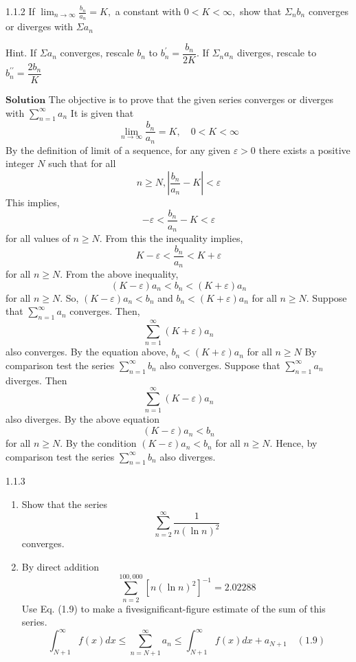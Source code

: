 \newpage






\begin{mybox}{1.1.2}
If $\displaystyle \lim _{n \rightarrow \infty} \frac{b_{n}}{a_{n}}=K,$ a constant with $0<K<\infty,$ show that $\Sigma_{n} b_{n}$ converges or diverges with $\Sigma a_{n}$

Hint. If $\Sigma a_{n}$ converges, rescale $b_{n}$ to $b_{n}^{\prime}=\dfrac{b_{n}}{2 K} .$ If $\Sigma_{n} a_{n}$ diverges, rescale to $b_{n}^{\prime \prime}=\dfrac{2 b_{n}}{K}$
\end{mybox}


$\boxed{\textbf{Solution}}$ The objective is to prove that the given series converges or diverges with $\sum_{n=1}^{\infty} a_{n}$
It is given that 
$$\lim_{n\rightarrow \infty} \frac{b_{n}}{a_{n}}=K, \quad 0<K<\infty$$
By the definition of limit of a sequence, for any given $\varepsilon>0$ there exists a positive integer $N$ such that for all 
$$n \geq N,\left|\frac{b_{n}}{a_{n}}-K\right|<\varepsilon$$
This implies, 
$$-\varepsilon<\frac{b_{n}}{a_{n}}-K<\varepsilon$$ for all values of $n \geq N$.
From this the inequality implies, 
$$K-\varepsilon<\frac{b_{n}}{a_{n}}<K+\varepsilon$$
for all $n \geq N$. From the above inequality, 
$$(K-\varepsilon) a_{n}<b_{n}<(K+\varepsilon) a_{n}$$ 
for all $n \geq N$. So, $(K-\varepsilon) a_{n}<b_{n}$ and $b_{n}<(K+\varepsilon) a_{n}$ for all $n \geq N$. Suppose that $\sum_{n=1}^{\infty} a_{n}$ converges. Then, 
$$\sum_{n=1}^{\infty}(K+\varepsilon) a_{n}$$ 
also converges. By the equation above, $b_{n}<(K+\varepsilon) a_{n}$ for all $n \geq N$
By comparison test the series $\sum_{n=1}^{\infty} b_{n}$ also converges. Suppose that $\sum_{n=1}^{\infty} a_{n}$ diverges. Then 
$$\sum_{n=1}^{\infty}(K-\varepsilon) a_{n}$$ 
also diverges. By the above equation 
$$(K-\varepsilon) a_{n}<b_{n}$$
for all $n \geq N$. By the condition $(K-\varepsilon) a_{n}<b_{n}$ for all $n \geq N$. Hence, by comparison test the series $\sum_{n=1}^{\infty} b_{n}$ also diverges.


\newpage



\begin{mybox}{1.1.3}
\begin{enumerate}[$(a)$]
\item Show that the series 
$$\sum_{n=2}^{\infty} \frac{1}{n(\ln n)^{2}}$$
converges.
\item By direct addition $$\sum_{n=2}^{100,000}\left[n(\ln n)^{2}\right]^{-1}=2.02288$$ Use Eq. (1.9) to make a fivesignificant-figure estimate of the sum of this series.	
$$
\int_{N+1}^{\infty} f(x) d x \leq \sum_{n=N+1}^{\infty} a_{n} \leq \int_{N+1}^{\infty} f(x) d x+a_{N+1} \quad (1.9)
$$
\end{enumerate}
\end{mybox}

